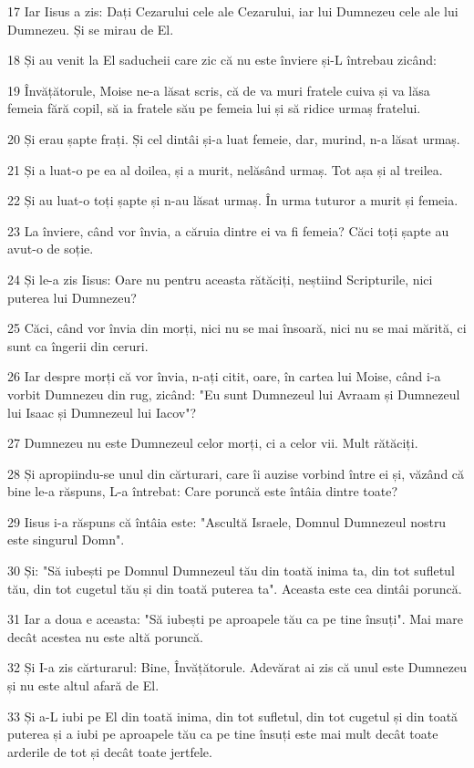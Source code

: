 \par 17 Iar Iisus a zis: Dați Cezarului cele ale Cezarului, iar lui Dumnezeu cele ale lui Dumnezeu. Și se mirau de El.
\par 18 Și au venit la El saducheii care zic că nu este înviere și-L întrebau zicând:
\par 19 Învățătorule, Moise ne-a lăsat scris, că de va muri fratele cuiva și va lăsa femeia fără copil, să ia fratele său pe femeia lui și să ridice urmaș fratelui.
\par 20 Și erau șapte frați. Și cel dintâi și-a luat femeie, dar, murind, n-a lăsat urmaș.
\par 21 Și a luat-o pe ea al doilea, și a murit, nelăsând urmaș. Tot așa și al treilea.
\par 22 Și au luat-o toți șapte și n-au lăsat urmaș. În urma tuturor a murit și femeia.
\par 23 La înviere, când vor învia, a căruia dintre ei va fi femeia? Căci toți șapte au avut-o de soție.
\par 24 Și le-a zis Iisus: Oare nu pentru aceasta rătăciți, neștiind Scripturile, nici puterea lui Dumnezeu?
\par 25 Căci, când vor învia din morți, nici nu se mai însoară, nici nu se mai mărită, ci sunt ca îngerii din ceruri.
\par 26 Iar despre morți că vor învia, n-ați citit, oare, în cartea lui Moise, când i-a vorbit Dumnezeu din rug, zicând: "Eu sunt Dumnezeul lui Avraam și Dumnezeul lui Isaac și Dumnezeul lui Iacov"?
\par 27 Dumnezeu nu este Dumnezeul celor morți, ci a celor vii. Mult rătăciți.
\par 28 Și apropiindu-se unul din cărturari, care îi auzise vorbind între ei și, văzând că bine le-a răspuns, L-a întrebat: Care poruncă este întâia dintre toate?
\par 29 Iisus i-a răspuns că întâia este: "Ascultă Israele, Domnul Dumnezeul nostru este singurul Domn".
\par 30 Și: "Să iubești pe Domnul Dumnezeul tău din toată inima ta, din tot sufletul tău, din tot cugetul tău și din toată puterea ta". Aceasta este cea dintâi poruncă.
\par 31 Iar a doua e aceasta: "Să iubești pe aproapele tău ca pe tine însuți". Mai mare decât acestea nu este altă poruncă.
\par 32 Și I-a zis cărturarul: Bine, Învățătorule. Adevărat ai zis că unul este Dumnezeu și nu este altul afară de El.
\par 33 Și a-L iubi pe El din toată inima, din tot sufletul, din tot cugetul și din toată puterea și a iubi pe aproapele tău ca pe tine însuți este mai mult decât toate arderile de tot și decât toate jertfele.
